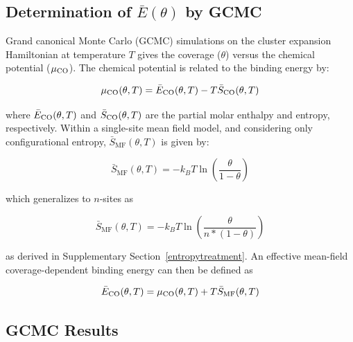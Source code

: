 \documentclass[11pt]{article}
\begin{document}
\subsection{Determination of \texorpdfstring{$\bar{E}(\theta)$}{lg} by GCMC}

Grand canonical Monte Carlo (GCMC) simulations on the cluster expansion Hamiltonian at temperature $T$ gives the coverage ($\theta$) versus the chemical potential ($\mu_{\ce{CO}}$). The chemical potential is related to the binding energy by:

\begin{equation} \label{GCMC_mu_eq}
	\mu_{\ce{CO}}(\theta,T) = \bar{E}_{\ce{CO}}(\theta,T) - T \bar{S}_{\ce{CO}}(\theta,T)
\end{equation}

\noindent where $\bar{E}_{\ce{CO}}(\theta,T)$ and $\bar{S}_{\ce{CO}}(\theta,T)$ are the partial molar enthalpy and entropy, respectively. Within a single-site mean field model, and considering only configurational entropy,  $\bar{S}_{\text{MF}}(\theta,T)$ is given by:\cite{Baker1966, Fowler1936}

\begin{equation} \label{entropy_one_meanfield}
	\bar{S}_\text{MF}(\theta,T) = -k_B T \ln \left ( \frac{\theta}{1-\theta} \right )
\end{equation}

\noindent which generalizes to $n$-sites as

\begin{equation} \label{entropy_n_meanfield}
	\bar{S}_\text{MF}(\theta,T) = -k_B T \ln \left ( \frac{\theta}{n*(1-\theta)} \right )
\end{equation}

\noindent as derived in Supplementary Section~\ref{entropytreatment}. An effective mean-field coverage-dependent binding energy can then be defined as 

\begin{equation} \label{ECO}
	\bar{E}_{\ce{CO}}(\theta,T) = \mu_{\ce{CO}}(\theta,T) + T\bar{S}_{\text{MF}}(\theta,T)
\end{equation}

\subsection{GCMC Results}
\end{document}
